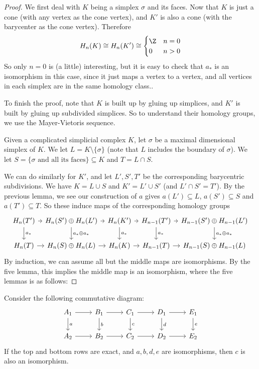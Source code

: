 \documentclass[a4paper]{article}
\begin{document}
\begin{proof}
  We first deal with $K$ being a simplex $\sigma$ and its faces. Now that $K$ is just a cone (with any vertex as the cone vertex), and $K'$ is also a cone (with the barycenter as the cone vertex). Therefore
  \[
    H_n(K) \cong H_{n}(K') \cong
    \begin{cases}
      \Z & n = 0\\
      0 & n > 0
    \end{cases}
  \]
  So only $n = 0$ is (a little) interesting, but it is easy to check that $a_*$ is an isomorphism in this case, since it just maps a vertex to a vertex, and all vertices in each simplex are in the same homology class..

  To finish the proof, note that $K$ is built up by gluing up simplices, and $K'$ is built by gluing up subdivided simplices. So to understand their homology groups, we use the Mayer-Vietoris sequence.

  Given a complicated simplicial complex $K$, let $\sigma$ be a maximal dimensional simplex of $K$. We let $L = K \setminus \{\sigma\}$ (note that $L$ includes the boundary of $\sigma$). We let $S = \{\sigma\text{ and all its faces}\} \subseteq K$ and $T = L \cap S$.

  We can do similarly for $K'$, and let $L', S', T'$ be the corresponding barycentric subdivisions. We have $K = L \cup S$ and $K' = L' \cup S'$ (and $L' \cap S' = T'$). By the previous lemma, we see our construction of $a$ gives $a(L') \subseteq L$, $a(S') \subseteq S$ and $a(T') \subseteq T$. So these induce maps of the corresponding homology groups
  \[
    \begin{tikzcd}[column sep=tiny]
      H_n(T') \ar[r] \ar[d, "a_*"] & H_n(S') \oplus H_n(L') \ar[r] \ar[d, "a_* \oplus a_*"] & H_n(K') \ar[r] \ar[d, "a_*"] & H_{n - 1}(T') \ar[r] \ar[d, "a_*"] & H_{n - 1}(S') \oplus H_{n - 1} (L') \ar[d, "a_* \oplus a_*"]\\
      H_n(T) \ar[r] & H_n(S) \oplus H_n(L) \ar[r] & H_n(K) \ar[r] & H_{n - 1}(T) \ar[r] & H_{n - 1}(S) \oplus H_{n - 1} (L)
    \end{tikzcd}
  \]
  By induction, we can assume all but the middle maps are isomorphisms. By the five lemma, this implies the middle map is an isomorphism, where the five lemmas is as follows:
\end{proof}

\begin{lemma}
  Consider the following commutative diagram:
  \[
    \begin{tikzcd}
      A_1 \ar[r] \ar[d, "a"] & B_1 \ar[r] \ar[d, "b"] & C_1 \ar[r] \ar[d, "c"] & D_1 \ar[r] \ar[d, "d"] & E_1 \ar[d, "e"]\\
      A_2 \ar[r] & B_2 \ar[r] & C_2 \ar[r] & D_2 \ar[r] & E_2
    \end{tikzcd}
  \]
  If the top and bottom rows are exact, and $a, b, d, e$ are isomorphisms, then $c$ is also an isomorphism.
\end{lemma}
\end{document}
